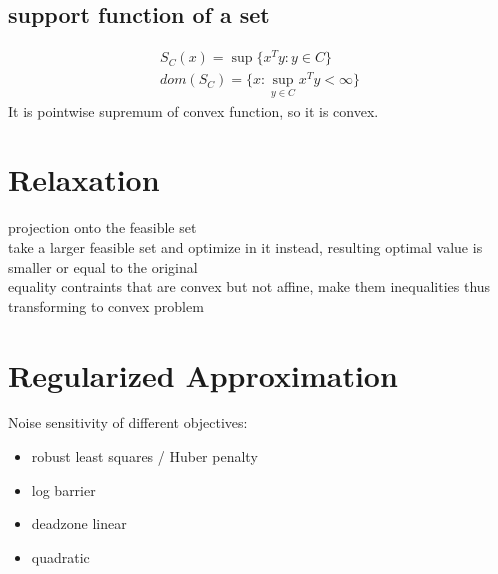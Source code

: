 \documentclass[8pt]{report}
\newcommand{\norm}[1]{\|#1\|}
\newcommand{\set}[1]{\{#1\}}
\begin{document}
\begin{multicols*}{2}
    
  
  \subsection{support function of a set}
  \begin{align*}
    S_C(x) = \sup \set{x^T y : y \in C}\\
    dom(S_C) = \set{x: \sup_{y\in C} x^Ty < \infty}
  \end{align*}
  It is pointwise supremum of convex function, so it is convex.
  
  \vfill\null

  \pagebreak
  
  \section{Relaxation}

  projection onto the feasible set\\

  take a larger feasible set and optimize in it instead, resulting optimal value is smaller or equal to the original\\

  equality contraints that are convex but not affine, make them inequalities thus transforming to convex problem
  
  \vfill\null
  
  \pagebreak

  \section{Regularized Approximation}

  Noise sensitivity of different objectives:
  \begin{itemize}
  \item robust least squares / Huber penalty
  \item log barrier
  \item deadzone linear
  \item quadratic
  \end{itemize}


\end{multicols*}
\end{document}
